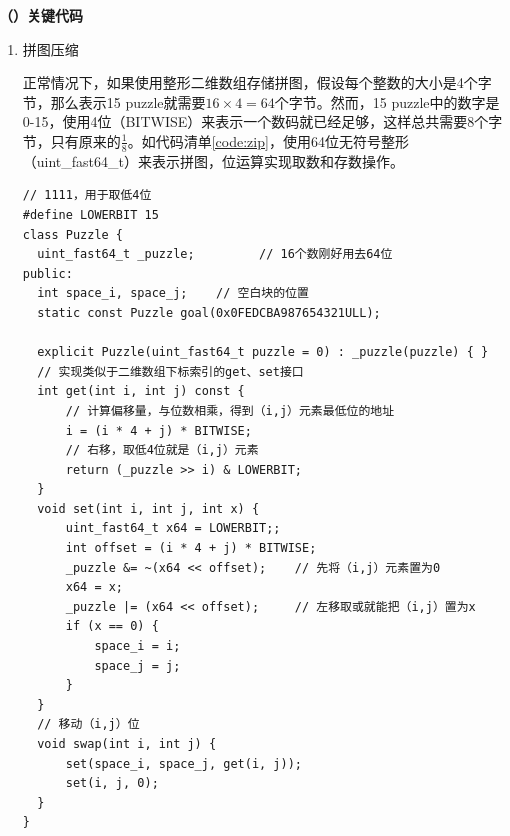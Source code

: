 \documentclass[10pt,letterpaper]{ctexart}
\newcommand\zhsubsec[1]{{%
\bfseries{
\stepcounter{subsection}（\zhnum{subsection}）{#1}}
\vspace{0.1pt}%
}}
\begin{document}
\newpage
\zhsubsec {关键代码}
\begin{enumerate}[itemindent=2.5em,label=\arabic*、]
  \item 拼图压缩
  \par \qquad 正常情况下，如果使用整形二维数组存储拼图，假设每个整数的大小是4个字节，那么表示15 puzzle就需要$16 \times 4=64$个字节。然而，15 puzzle中的数字是0-15，使用4位（BITWISE）来表示一个数码就已经足够，这样总共需要8个字节，只有原来的$\frac{1}{8}$。如代码清单\ref{code:zip}，使用64位无符号整形（uint\_fast64\_t）来表示拼图，位运算实现取数和存数操作。

\begin{lstlisting}[caption=拼图压缩,label={code:zip},captionpos=b]
// 1111，用于取低4位
#define LOWERBIT 15
class Puzzle {
  uint_fast64_t _puzzle;         // 16个数刚好用去64位
public:
  int space_i, space_j;    // 空白块的位置
  static const Puzzle goal(0x0FEDCBA987654321ULL);

  explicit Puzzle(uint_fast64_t puzzle = 0) : _puzzle(puzzle) { }
  // 实现类似于二维数组下标索引的get、set接口
  int get(int i, int j) const {
      // 计算偏移量，与位数相乘，得到（i,j）元素最低位的地址
      i = (i * 4 + j) * BITWISE;
      // 右移，取低4位就是（i,j）元素
      return (_puzzle >> i) & LOWERBIT;
  }
  void set(int i, int j, int x) {
      uint_fast64_t x64 = LOWERBIT;;
      int offset = (i * 4 + j) * BITWISE;
      _puzzle &= ~(x64 << offset);    // 先将（i,j）元素置为0
      x64 = x;
      _puzzle |= (x64 << offset);     // 左移取或就能把（i,j）置为x
      if (x == 0) {
          space_i = i;
          space_j = j;
      }
  }
  // 移动（i,j）位
  void swap(int i, int j) {
      set(space_i, space_j, get(i, j));
      set(i, j, 0);
  }
}
\end{lstlisting}


\end{enumerate}
\end{document}
